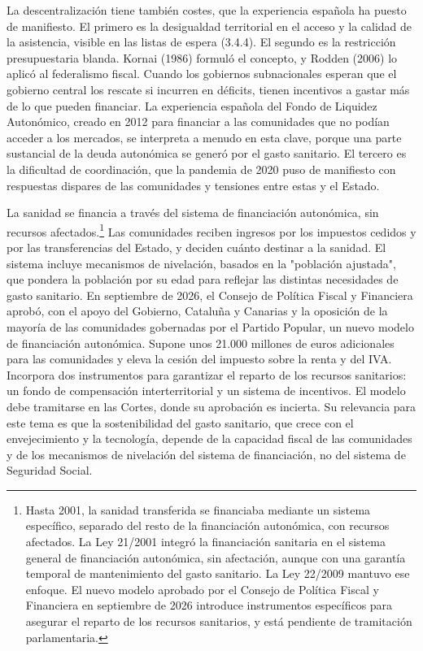 \documentclass[10pt,a4paper]{article}
\begin{document}
La descentralización tiene también costes, que la experiencia española ha puesto de manifiesto. El primero es la desigualdad territorial en el acceso y la calidad de la asistencia, visible en las listas de espera (3.4.4). El segundo es la restricción presupuestaria blanda. Kornai (1986) formuló el concepto, y Rodden (2006) lo aplicó al federalismo fiscal. Cuando los gobiernos subnacionales esperan que el gobierno central los rescate si incurren en déficits, tienen incentivos a gastar más de lo que pueden financiar. La experiencia española del Fondo de Liquidez Autonómico, creado en 2012 para financiar a las comunidades que no podían acceder a los mercados, se interpreta a menudo en esta clave, porque una parte sustancial de la deuda autonómica se generó por el gasto sanitario. El tercero es la dificultad de coordinación, que la pandemia de 2020 puso de manifiesto con respuestas dispares de las comunidades y tensiones entre estas y el Estado.

La sanidad se financia a través del sistema de financiación autonómica, sin recursos afectados.\footnote{%
    Hasta 2001, la sanidad transferida se financiaba mediante un sistema específico, separado del resto de la financiación autonómica, con recursos afectados. La Ley 21/2001 integró la financiación sanitaria en el sistema general de financiación autonómica, sin afectación, aunque con una garantía temporal de mantenimiento del gasto sanitario. La Ley 22/2009 mantuvo ese enfoque. El nuevo modelo aprobado por el Consejo de Política Fiscal y Financiera en septiembre de 2026 introduce instrumentos específicos para asegurar el reparto de los recursos sanitarios, y está pendiente de tramitación parlamentaria.
} Las comunidades reciben ingresos por los impuestos cedidos y por las transferencias del Estado, y deciden cuánto destinar a la sanidad. El sistema incluye mecanismos de nivelación, basados en la "población ajustada", que pondera la población por su edad para reflejar las distintas necesidades de gasto sanitario. En septiembre de 2026, el Consejo de Política Fiscal y Financiera aprobó, con el apoyo del Gobierno, Cataluña y Canarias y la oposición de la mayoría de las comunidades gobernadas por el Partido Popular, un nuevo modelo de financiación autonómica. Supone unos 21.000 millones de euros adicionales para las comunidades y eleva la cesión del impuesto sobre la renta y del IVA. Incorpora dos instrumentos para garantizar el reparto de los recursos sanitarios: un fondo de compensación interterritorial y un sistema de incentivos. El modelo debe tramitarse en las Cortes, donde su aprobación es incierta. Su relevancia para este tema es que la sostenibilidad del gasto sanitario, que crece con el envejecimiento y la tecnología, depende de la capacidad fiscal de las comunidades y de los mecanismos de nivelación del sistema de financiación, no del sistema de Seguridad Social.
\end{document}
